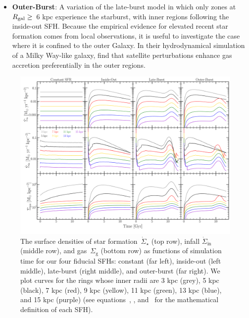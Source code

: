 \begin{itemize}
	\item \textbf{Outer-Burst}: A variation of the late-burst model in which 
	only zones at~$R_\text{gal} \geq$~6 kpc experience the starburst, with inner 
	regions following the inside-out SFH. 
	Because the empirical evidence for elevated recent star formation comes 
	from local observations, it is useful to investigate the case where it is 
	confined to the outer Galaxy. 
	In their hydrodynamical simulation of a Milky Way-like galaxy, 
	\citet{Vincenzo2020} find that satellite perturbations enhance gas 
	accretion preferentially in the outer regions. 
\end{itemize} 

\begin{figure} 
\centering 
\includegraphics[scale = 0.32]{evol.pdf} 
\caption{The surface densities of star formation~$\dot{\Sigma}_\star$ (top 
row), infall $\dot{\Sigma}_\text{in}$ (middle row), and gas~$\Sigma_\text{g}$ 
(bottom row) as functions of simulation time for our four fiducial SFHs: 
constant (far left), inside-out (left middle), late-burst (right middle), and 
outer-burst (far right). We plot curves for the rings whose inner radii are 
3 kpc (grey), 5 kpc (black), 7 kpc (red), 9 kpc (yellow), 11 kpc (green), 13 
kpc (blue), and 15 kpc (purple) (see equations~, 
, and~ for the mathematical 
definition of each SFH). 
}
\label{migration:fig:evol} 
\end{figure} 

